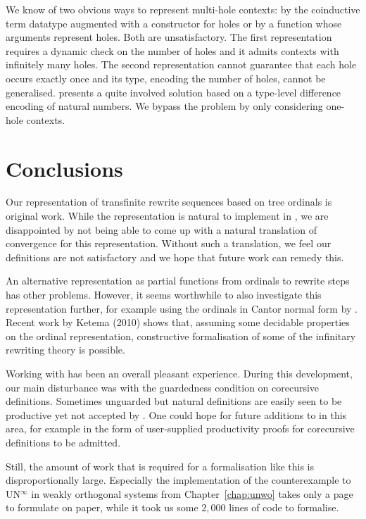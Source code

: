 We know of two obvious ways to represent multi-hole contexts:
by the coinductive term datatype augmented with a constructor for
holes or by a function whose arguments represent holes.
Both are unsatisfactory. The first representation requires a dynamic
check on the number of holes and it admits contexts with infinitely
many holes. The second representation cannot guarantee
that each hole occurs exactly once and its type, encoding the number of
holes, cannot be generalised. \citet{lindley-08} presents a quite
involved solution based on a type-level difference encoding of natural
numbers. We bypass the problem by only considering one-hole contexts.


\section{Conclusions}

Our representation of transfinite rewrite sequences based on tree
ordinals is original work. While the representation is natural to
implement in \Coq, we are disappointed by not being able to come up
with a natural translation of convergence for this
representation. Without such a translation, we feel our definitions
are not satisfactory and we hope that future work can remedy this.


An alternative representation as partial functions from
ordinals to rewrite steps has other problems. However, it seems
worthwhile to also investigate this representation further, for example
using the ordinals in Cantor normal form by
\citet{casteran-06}. Recent work by Ketema (2010) shows that, assuming
some decidable properties on the ordinal representation, constructive
formalisation of some of the infinitary rewriting theory is possible.

Working with \Coq has been an overall pleasant experience. During this
development, our main disturbance was with the guardedness condition
on corecursive definitions. Sometimes unguarded but natural
definitions are easily seen to be productive yet not accepted by
\Coq. One could hope for future additions to \Coq in this area, for
example in the form of user-supplied productivity proofs for
corecursive definitions to be admitted.

Still, the amount of work that is required for a formalisation like
this is disproportionally large. Especially the implementation of the
counterexample to UN$^\infty$ in weakly orthogonal systems from
Chapter~\ref{chap:unwo} takes only a page to formulate on paper, while
it took us some $2,000$ lines of \Coq code to formalise.


